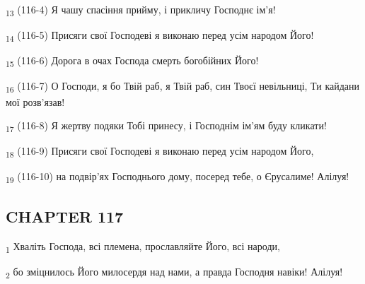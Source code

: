 \begin{tcolorbox}
\textsubscript{13} (116-4) Я чашу спасіння прийму, і прикличу Господнє ім'я!
\end{tcolorbox}
\begin{tcolorbox}
\textsubscript{14} (116-5) Присяги свої Господеві я виконаю перед усім народом Його!
\end{tcolorbox}
\begin{tcolorbox}
\textsubscript{15} (116-6) Дорога в очах Господа смерть богобійних Його!
\end{tcolorbox}
\begin{tcolorbox}
\textsubscript{16} (116-7) О Господи, я бо Твій раб, я Твій раб, син Твоєї невільниці, Ти кайдани мої розв'язав!
\end{tcolorbox}
\begin{tcolorbox}
\textsubscript{17} (116-8) Я жертву подяки Тобі принесу, і Господнім ім'ям буду кликати!
\end{tcolorbox}
\begin{tcolorbox}
\textsubscript{18} (116-9) Присяги свої Господеві я виконаю перед усім народом Його,
\end{tcolorbox}
\begin{tcolorbox}
\textsubscript{19} (116-10) на подвір'ях Господнього дому, посеред тебе, о Єрусалиме! Алілуя!
\end{tcolorbox}
\subsection{CHAPTER 117}
\begin{tcolorbox}
\textsubscript{1} Хваліть Господа, всі племена, прославляйте Його, всі народи,
\end{tcolorbox}
\begin{tcolorbox}
\textsubscript{2} бо зміцнилось Його милосердя над нами, а правда Господня навіки! Алілуя!
\end{tcolorbox}
